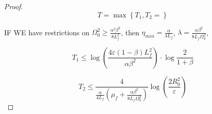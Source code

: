 \begin{proof}
$$
T = \max \left\{T_1, T_2=\right\}
$$

IF WE have restrictions on $\Omega_0^2 \geq \frac{\alpha^2 \beta^2}{8L_f^2}$, then $\eta_{min} = \frac{\alpha}{4L_f}$, $\lambda = \frac{\alpha \beta^2}{8L_f \Omega_0^2}$, 

$$
T_1 \leq \log{\left( \frac{4 \varepsilon (1-\beta) L_f^2 }{\alpha \beta^2} \right)} \cdot \log{\frac{2}{1+\beta}}
$$

$$
T_2 \leq \frac{4}{\frac{\alpha}{4L_f} \left(\mu_f + \frac{\alpha \beta^2}{8L_f \Omega_0^2} \right)}\log{\left(\frac{2 R_0^2}{\varepsilon} \right)}
$$



\end{proof}
\fi
